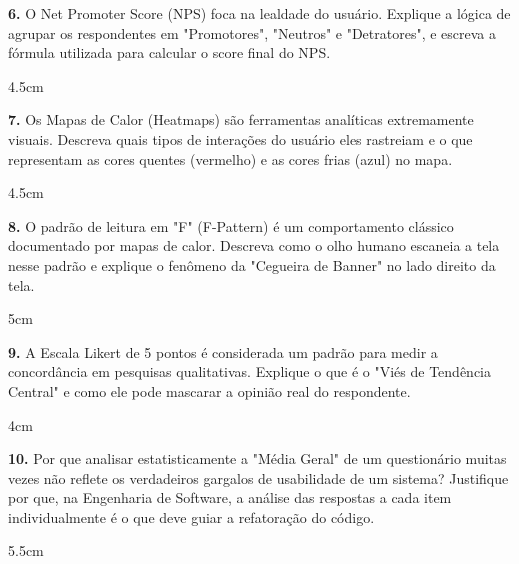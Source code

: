 \documentclass[12pt]{article}
\begin{document}
\textbf{6.} O Net Promoter Score (NPS) foca na lealdade do usuário. Explique a lógica de agrupar os respondentes em "Promotores", "Neutros" e "Detratores", e escreva a fórmula utilizada para calcular o score final do NPS.
\begin{resposta}{4.5cm}
\end{resposta}

\vspace{0.5cm}

\textbf{7.} Os Mapas de Calor (Heatmaps) são ferramentas analíticas extremamente visuais. Descreva quais tipos de interações do usuário eles rastreiam e o que representam as cores quentes (vermelho) e as cores frias (azul) no mapa.
\begin{resposta}{4.5cm}
\end{resposta}

\vspace{0.5cm}

\textbf{8.} O padrão de leitura em "F" (F-Pattern) é um comportamento clássico documentado por mapas de calor. Descreva como o olho humano escaneia a tela nesse padrão e explique o fenômeno da "Cegueira de Banner" no lado direito da tela.
\begin{resposta}{5cm}
\end{resposta}

\vspace{0.5cm}

\textbf{9.} A Escala Likert de 5 pontos é considerada um padrão para medir a concordância em pesquisas qualitativas. Explique o que é o "Viés de Tendência Central" e como ele pode mascarar a opinião real do respondente.
\begin{resposta}{4cm}
\end{resposta}

\vspace{0.5cm}

\textbf{10.} Por que analisar estatisticamente a "Média Geral" de um questionário muitas vezes não reflete os verdadeiros gargalos de usabilidade de um sistema? Justifique por que, na Engenharia de Software, a análise das respostas a cada item individualmente é o que deve guiar a refatoração do código.
\begin{resposta}{5.5cm}
\end{resposta}
\end{document}
